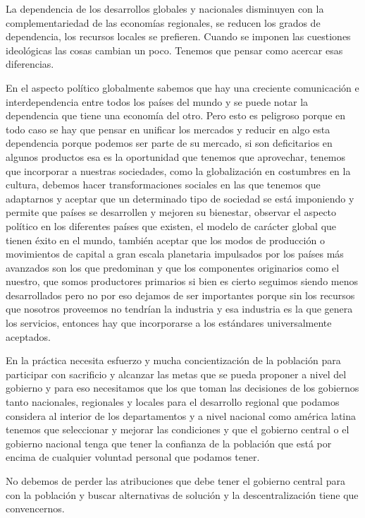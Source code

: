 \documentclass[
  a4paper,
]{article}
\begin{document}
La dependencia de los desarrollos globales y nacionales disminuyen con
la complementariedad de las economías regionales, se reducen los grados
de dependencia, los recursos locales se prefieren. Cuando se imponen las
cuestiones ideológicas las cosas cambian un poco. Tenemos que pensar
como acercar esas diferencias.

En el aspecto político globalmente sabemos que hay una creciente
comunicación e interdependencia entre todos los países del mundo y se
puede notar la dependencia que tiene una economía del otro. Pero esto es
peligroso porque en todo caso se hay que pensar en unificar los mercados
y reducir en algo esta dependencia porque podemos ser parte de su
mercado, si son deficitarios en algunos productos esa es la oportunidad
que tenemos que aprovechar, tenemos que incorporar a nuestras
sociedades, como la globalización en costumbres en la cultura, debemos
hacer transformaciones sociales en las que tenemos que adaptarnos y
aceptar que un determinado tipo de sociedad se está imponiendo y permite
que países se desarrollen y mejoren su bienestar, observar el aspecto
político en los diferentes países que existen, el modelo de carácter
global que tienen éxito en el mundo, también aceptar que los modos de
producción o movimientos de capital a gran escala planetaria impulsados
por los países más avanzados son los que predominan y que los
componentes originarios como el nuestro, que somos productores primarios
si bien es cierto seguimos siendo menos desarrollados pero no por eso
dejamos de ser importantes porque sin los recursos que nosotros
proveemos no tendrían la industria y esa industria es la que genera los
servicios, entonces hay que incorporarse a los estándares universalmente
aceptados.

En la práctica necesita esfuerzo y mucha concientización de la población
para participar con sacrificio y alcanzar las metas que se pueda
proponer a nivel del gobierno y para eso necesitamos que los que toman
las decisiones de los gobiernos tanto nacionales, regionales y locales
para el desarrollo regional que podamos considera al interior de los
departamentos y a nivel nacional como américa latina tenemos que
seleccionar y mejorar las condiciones y que el gobierno central o el
gobierno nacional tenga que tener la confianza de la población que está
por encima de cualquier voluntad personal que podamos tener.

No debemos de perder las atribuciones que debe tener el gobierno central
para con la población y buscar alternativas de solución y la
descentralización tiene que convencernos.
\end{document}
